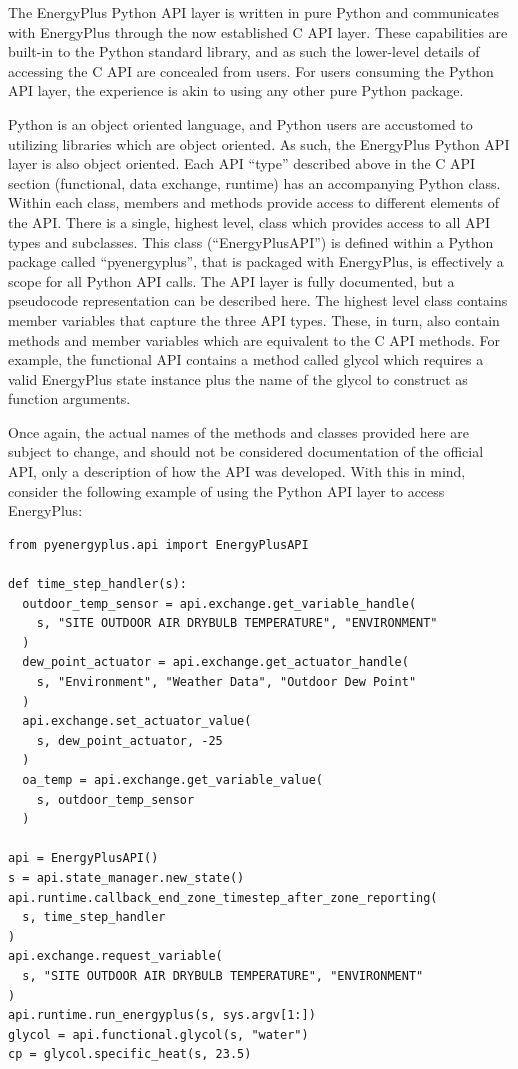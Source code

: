 \documentclass[5p]{elsarticle}
\begin{document}
The EnergyPlus Python API layer is written in pure Python and communicates with EnergyPlus through the now established C API layer.  These capabilities are built-in to the Python standard library, and as such the lower-level details of accessing the C API are concealed from users.  For users consuming the Python API layer, the experience is akin to using any other pure Python package.

Python is an object oriented language, and Python users are accustomed to utilizing libraries which are object oriented.  As such, the EnergyPlus Python API layer is also object oriented.  Each API “type” described above in the C API section (functional, data exchange, runtime) has an accompanying Python class.  Within each class, members and methods provide access to different elements of the API.  There is a single, highest level, class which provides access to all API types and subclasses.  This class (“EnergyPlusAPI”) is defined within a Python package called “pyenergyplus”, that is packaged with EnergyPlus, is effectively a scope for all Python API calls.  The API layer is fully documented, but a pseudocode representation can be described here.  The highest level class contains member variables that capture the three API types.  These, in turn, also contain methods and member variables which are equivalent to the C API methods.  For example, the functional API contains a method called glycol which requires a valid EnergyPlus state instance plus the name of the glycol to construct as function arguments.

Once again, the actual names of the methods and classes provided here are subject to change, and should not be considered documentation of the official API, only a description of how the API was developed.  With this in mind, consider the following example of using the Python API layer to access EnergyPlus:

\lstset{language=python}
\begin{lstlisting}
from pyenergyplus.api import EnergyPlusAPI

def time_step_handler(s):
  outdoor_temp_sensor = api.exchange.get_variable_handle(
    s, "SITE OUTDOOR AIR DRYBULB TEMPERATURE", "ENVIRONMENT"
  )
  dew_point_actuator = api.exchange.get_actuator_handle(
    s, "Environment", "Weather Data", "Outdoor Dew Point"
  )
  api.exchange.set_actuator_value(
    s, dew_point_actuator, -25
  )
  oa_temp = api.exchange.get_variable_value(
    s, outdoor_temp_sensor
  )

api = EnergyPlusAPI()
s = api.state_manager.new_state()
api.runtime.callback_end_zone_timestep_after_zone_reporting(
  s, time_step_handler
)
api.exchange.request_variable(
  s, "SITE OUTDOOR AIR DRYBULB TEMPERATURE", "ENVIRONMENT"
)
api.runtime.run_energyplus(s, sys.argv[1:])
glycol = api.functional.glycol(s, "water")
cp = glycol.specific_heat(s, 23.5)
\end{lstlisting}
\end{document}
